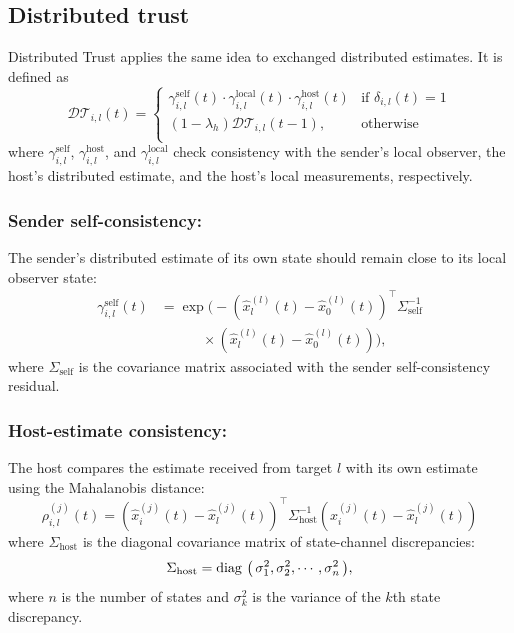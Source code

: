 \documentclass{ifacconf}
\def\diag#1{\mathop{{\rm diag}\,\left(\,#1\,\right)}}
\def\DT{\mathcal{DT}} %
\begin{document}


\subsection{Distributed trust}
\vspace*{-0.3cm}
Distributed Trust applies the same idea to exchanged distributed estimates. It is defined as
\begin{equation}
        \DT_{i,l}(t)  = \begin{cases}
       \gamma_{i,l}^{\text{self}}(t) \cdot \gamma_{i,l}^{\text{local}}(t) \cdot
        \gamma_{i,l}^{\text{host}}(t)   &  \text{if } \delta_{i,l}(t) = 1 \\
        (1 - \lambda_h)\DT_{i,l}(t-1), & \text{otherwise} \\
    \end{cases}
\end{equation}
where $\gamma_{i,l}^{\text{self}}$, $\gamma_{i,l}^{\text{host}}$, and $\gamma_{i,l}^{\text{local}}$ check consistency with the sender's local observer, the host's distributed estimate, and the host's local measurements, respectively.

\subsubsection{Sender self-consistency:}
The sender's distributed estimate of its own state should remain close to its local observer state:
\begin{equation}
    \begin{aligned}
    \gamma_{i,l}^{\text{self}}(t)
    &=
    \exp\Big(
    -(\hat{x}_l^{(l)}(t)-\hat{x}_0^{(l)}(t))^{\top}
    \Sigma_{\text{self}}^{-1} \\
    &\qquad\quad \times
    (\hat{x}_l^{(l)}(t)-\hat{x}_0^{(l)}(t))
    \Big),
    \end{aligned}
\end{equation}
where $\Sigma_{\text{self}}$ is the covariance matrix associated with the sender self-consistency residual.


\subsubsection{Host-estimate consistency:}
The host compares the estimate received from target $l$ with its own estimate using the Mahalanobis distance:
\begin{equation}
    \rho_{i,l}^{(j)}(t) = \left( \hat{x}_i^{(j)}(t) - \hat{x}_l^{(j)}(t) \right)^{\top} \Sigma_{\text{host}}^{-1} \left( \hat{x}_i^{(j)}(t) - \hat{x}_l^{(j)}(t) \right)
    \label{eq_dis_glo}
\end{equation}
where $\Sigma_{\text{host}}$ is the diagonal covariance matrix of state-channel discrepancies:
\begin{equation}
\Sigma_{\text{host}} = \diag{\sigma^2_1, \sigma^2_2, \cdots , \sigma^2_n},
\end{equation}
where $n$ is the number of states and $\sigma^2_k$ is the variance of the $k$th state discrepancy. 
\end{document}

